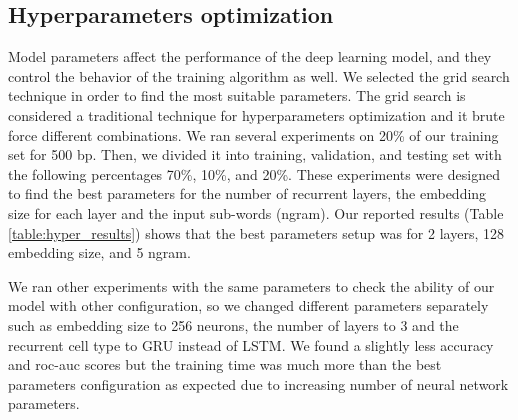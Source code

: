 \documentclass[conference]{IEEEtran}
\begin{document}
\subsection{Hyperparameters optimization}

Model parameters affect the performance of the deep learning model, and they control the behavior of the training algorithm as well. We selected the grid search technique in order to find the most suitable parameters. The grid search is considered a traditional technique for hyperparameters optimization and it brute force different combinations. We ran several experiments on 20\% of our training set for 500 bp. Then, we divided it into training, validation, and testing set with the following percentages 70\%, 10\%, and 20\%. These experiments were designed to find the best parameters for the number of recurrent layers, the embedding size for each layer and the input sub-words (ngram). Our reported results (Table \ref{table:hyper_results}) shows that the best parameters setup was for 2 layers, 128 embedding size, and 5 ngram. 

We ran other experiments with the same parameters to check the ability of our model with other configuration, so we changed different parameters separately such as embedding size to 256 neurons, the number of layers to 3 and the recurrent cell type to GRU instead of LSTM. We found a slightly less accuracy and roc-auc scores but the training time was much more than the best parameters configuration as expected due to increasing number of neural network parameters.
\end{document}
